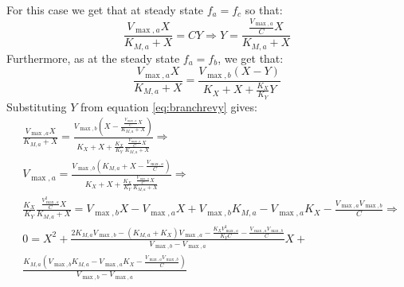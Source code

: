     For this case we get that at steady state $f_a=f_c$ so that:
    \begin{equation}
        \label{eq:branchrevy}
        \frac{V_{\max,a}X}{K_{M,a}+X}=CY \Rightarrow Y=\frac{\frac{V_{\max,a}}{C}X}{K_{M,a}+X}
    \end{equation}
    Furthermore, as at the steady state $f_a=f_b$, we get that:
    \begin{equation*}
        \frac{V_{\max,a}X}{K_{M,a}+X}=\frac{V_{\max,b}(X-Y)}{K_X+X+\frac{K_X}{K_Y}Y}
    \end{equation*}
    Substituting $Y$ from equation \ref{eq:branchrevy} gives:
    \begin{align*}
        &\frac{V_{\max,a}X}{K_{M,a}+X}=\frac{V_{\max,b}(X-\frac{\frac{V_{\max,a}}{C}X}{K_{M,a}+X})}{K_X+X+\frac{K_X}{K_Y}\frac{\frac{V_{\max,a}}{C}X}{K_{M,a}+X}} \Rightarrow \\
        &V_{\max,a}=\frac{V_{\max,b}(K_{M,a}+X-\frac{V_{\max,a}}{C})}{K_X+X+\frac{K_X}{K_Y}\frac{\frac{V_{\max,a}}{C}X}{K_{M,a}+X}} \Rightarrow \\
        &\frac{K_X}{K_Y}\frac{\frac{V_{\max,a}^2}{C}X}{K_{M,a}+X}=V_{\max,b}X-V_{\max,a}X+V_{\max,b}K_{M,a}-V_{\max,a}K_X-\frac{V_{\max,a}V_{\max,b}}{C} \Rightarrow \\
        &0=X^2+\frac{2K_{M,a}V_{\max,b}-(K_{M,a}+K_X)V_{\max,a}-\frac{K_XV_{\max,a}^2}{K_YC}-\frac{V_{\max,a}V_{\max,b}}{C}}{V_{\max,b}-V_{\max,a}}X+\\
        &\frac{K_{M,a}(V_{\max,b}K_{M,a}-V_{\max,a}K_X-\frac{V_{\max,a}V_{\max,b}}{C})}{V_{\max,b}-V_{\max,a}}
    \end{align*}

